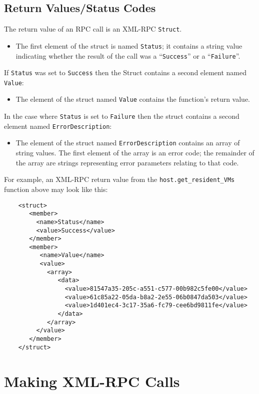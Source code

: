 \subsection{Return Values/Status Codes}
\label{synchronous-result}

The return value of an RPC call is an XML-RPC {\tt Struct}.

\begin{itemize}
\item The first element of the struct is named {\tt Status}; it
contains a string value indicating whether the result of the call was
a ``{\tt Success}'' or a ``{\tt Failure}''.
\end{itemize}

If {\tt Status} was set to {\tt Success} then the Struct contains a second
element named {\tt Value}:
\begin{itemize}
\item The element of the struct named {\tt Value} contains the function's return value.
\end{itemize}

In the case where {\tt Status} is set to {\tt Failure} then
the struct contains a second element named {\tt ErrorDescription}:
\begin{itemize}
\item The element of the struct named {\tt ErrorDescription} contains
an array of string values. The first element of the array is an error code;
the remainder of the array are strings representing error parameters relating
to that code.
\end{itemize}

For example, an XML-RPC return value from the {\tt host.get\_resident\_VMs}
function above
may look like this:
\begin{verbatim}
    <struct>
       <member>
         <name>Status</name>
         <value>Success</value>
       </member>
       <member>
          <name>Value</name>
          <value>
            <array>
               <data>
                 <value>81547a35-205c-a551-c577-00b982c5fe00</value>
                 <value>61c85a22-05da-b8a2-2e55-06b0847da503</value>
                 <value>1d401ec4-3c17-35a6-fc79-cee6bd9811fe</value>
               </data>
            </array>
         </value>
       </member>
    </struct>
\end{verbatim}

\section{Making XML-RPC Calls}

